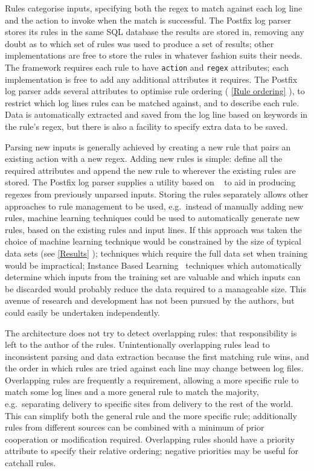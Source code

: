 \documentclass[draft]{svmult}
\newcommand{\sectionref}[1]{%
    \textsection{}\vref*{#1}%
}
\begin{document}
Rules categorise inputs, specifying both the regex to match against each
log line and the action to invoke when the match is successful.  The
Postfix log parser stores its rules in the same SQL database the results
are stored in, removing any doubt as to which set of rules was used to
produce a set of results; other implementations are free to store the rules
in whatever fashion suits their needs.  The framework requires each rule to
have \texttt{action} and \texttt{regex} attributes; each implementation is
free to add any additional attributes it requires.  The Postfix log parser
adds several attributes to optimise rule ordering (\sectionref{Rule
ordering}), to restrict which log lines rules can be matched against, and
to describe each rule.  Data is automatically extracted and saved from the
log line based on keywords in the rule's regex, but there is also a
facility to specify extra data to be saved.

Parsing new inputs is generally achieved by creating a new rule that pairs
an existing action with a new regex.  Adding new rules is simple: define
all the required attributes and append the new rule to wherever the
existing rules are stored.  The Postfix log parser supplies a utility based
on \SLCT{}~\cite{slct-paper} to aid in producing regexes from previously
unparsed inputs.  Storing the rules separately allows other approaches to
rule management to be used, e.g.\ instead of manually adding new rules,
machine learning techniques could be used to automatically generate new
rules, based on the existing rules and input lines.  If this approach was
taken the choice of machine learning technique would be constrained by the
size of typical data sets (see \sectionref{Results}); techniques which
require the full data set when training would be impractical; Instance
Based Learning~\cite{instance-based-learning} techniques which
automatically determine which inputs from the training set are valuable and
which inputs can be discarded would probably reduce the data required to a
manageable size.  This avenue of research and development has not been
pursued by the authors, but could easily be undertaken independently.

The architecture does not try to detect overlapping rules: that
responsibility is left to the author of the rules.  Unintentionally
overlapping rules lead to inconsistent parsing and data extraction because
the first matching rule wins, and the order in which rules are tried
against each line may change between log files.  Overlapping rules are
frequently a requirement, allowing a more specific rule to match some log
lines and a more general rule to match the majority, e.g.\ separating
\SMTP{} delivery to specific sites from \SMTP{} delivery to the rest of the
world.  This can simplify both the general rule and the more specific rule;
additionally rules from different sources can be combined with a minimum of
prior cooperation or modification required.  Overlapping rules should have
a priority attribute to specify their relative ordering; negative
priorities may be useful for catchall rules.
\end{document}

